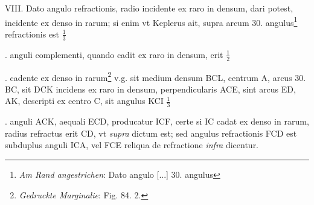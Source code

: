 \pend \pstart[p.~107] VIII. Dato angulo refractionis\protect{}, radio incidente ex  raro in densum, dari potest, incidente ex denso in rarum; si enim vt Keplerus\protect{} ait, supra arcum 30. angulus\protect{}\footnote{\textit{Am Rand angestrichen}: Dato angulo [...] 30. angulus}  refractionis est $\displaystyle \frac{1}{3}$\rule[-4mm]{0mm}{10mm}. anguli complementi, quando cadit  ex raro in densum, erit $\displaystyle \frac{1}{2}$\rule[-4mm]{0mm}{10mm}. cadente ex denso in rarum\footnote{\textit{Gedruckte Marginalie}: Fig. 84. 2.}  v.g. sit medium densum BCL, centrum A, arcus 30.  BC, sit DCK incidens ex raro in densum, perpendicularis ACE, sint arcus ED, AK, descripti ex  centro C, sit angulus KCI $\displaystyle \frac{1}{3}$\rule[-4mm]{0mm}{10mm}. anguli ACK, aequali  ECD, producatur ICF, certe si IC cadat ex denso in rarum, radius refractus erit CD, vt \textit{supra} dictum est; sed angulus refractionis\protect{} FCD est subduplus  anguli ICA, vel FCE reliqua de refractione\protect{} \textit{infra}  dicentur. 